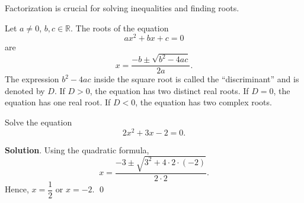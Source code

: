 \documentclass[11pt]{book}
\theoremstyle{break}
\theoremstyle{no_label}
\newcommand{\bbR}{\mathbb{R}}
\numberwithin{equation}{section}
\begin{document}
Factorization is crucial for solving inequalities and finding roots.

\begin{theorem}
    Let $a\ne0$, $b, c\in\bbR$. The roots of the equation $$ax^2+bx+c=0$$ are $$x=\dfrac{-b\pm\sqrt{b^2-4ac}}{2a}.$$ The expression $b^2-4ac$ inside the square root is called the ``discriminant'' and is denoted by $D$. If $D>0$, the equation has two distinct real roots. If $D=0$, the equation has one real root. If $D<0$, the equation has two complex roots.
\end{theorem}

\begin{example}
    Solve the equation $$2x^2+3x-2=0.$$
\end{example}
\textbf{Solution}. Using the quadratic formula, $$x=\dfrac{-3\pm\sqrt{3^2+4\cdot2\cdot(-2)}}{2\cdot 2}.$$ Hence, $x=\dfrac{1}{2}$ or $x=-2$. \qed
\end{document}

